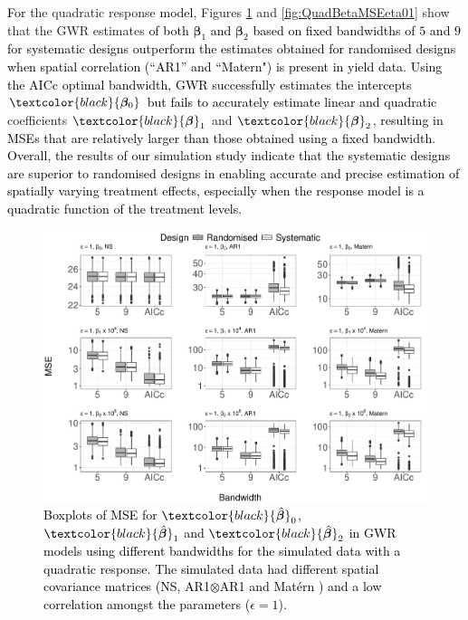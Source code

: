 \documentclass[a4paper]{article} 	%
\newcommand{\Matern}{Mat\'ern }
\newcommand{\revision}[1]{\textcolor{black}{#1}}
\newcommand{\zc}[1]{\textcolor{black}{#1}}
\begin{document}
\revision{For} the quadratic response \revision{model}, Figures \ref{fig:QuadBetaMSE} and \ref{fig:QuadBetaMSEeta01} show that the GWR estimates \revision{of both ${\bm{\beta}}_{1}$ and ${\bm{\beta}}_{2}$ based on fixed bandwidths of $5$ and $9$ for systematic designs outperform the estimates obtained for randomised designs when spatial correlation (``AR1'' and ``Matern") is present in yield data}. \revision{Using the AICc optimal bandwidth, GWR successfully estimates the intercepts $\zc{\bm{\beta}_0}$ but fails to accurately estimate} \zc{linear and quadratic} coefficients $\zc{\bm{\beta}}_1$ and $\zc{\bm{\beta}}_2$, \revision{resulting in MSEs that are relatively larger than those obtained using a fixed bandwidth}. \revision{Overall, the results of our simulation study indicate that the systematic designs are superior to randomised designs in enabling accurate and precise estimation of spatially varying treatment effects, especially when the response model is a quadratic function of the treatment levels.} 




\begin{figure}[!thp]
	\centering
	\includegraphics[width=\linewidth]{Col_QuaCombMSE_newpar_1K_V4.pdf}
	\caption{\zc{Boxplots of MSE for $\zc{\hat{\bm{\beta}}}_0$, $\zc{\hat{\bm{\beta}}}_1$ and $\zc{\hat{\bm{\beta}}}_2$ in GWR models using different bandwidths for the simulated data with a quadratic response. The simulated data had different spatial covariance matrices (NS, AR1$\otimes$AR1 and \Matern) and a low correlation amongst the parameters ($\epsilon=1$).}} \label{fig:QuadBetaMSE}
\end{figure}
\end{document}

